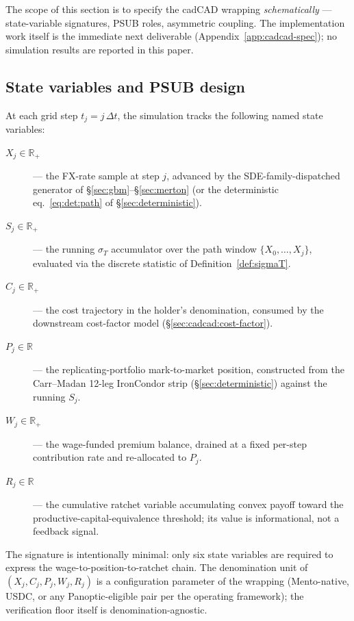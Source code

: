\documentclass[11pt,letterpaper]{article}
\newcommand{\R}{\mathbb{R}}
\newcommand{\sigmaT}{\sigma_{T}}
\begin{document}
The scope of this section is to specify the cadCAD wrapping
\emph{schematically} — state-variable signatures, PSUB roles, asymmetric
coupling. The implementation work itself is the immediate next
deliverable (Appendix~\ref{app:cadcad-spec}); no simulation results are
reported in this paper.

\subsection{State variables and PSUB design}
\label{sec:cadcad:psub}

At each grid step $t_{j} = j\,\Delta t$, the simulation tracks the
following named state variables:
\begin{description}
    \item[$X_{j} \in \R_{+}$] — the FX-rate sample at step $j$, advanced
        by the SDE-family-dispatched generator of
        \S\ref{sec:gbm}--\S\ref{sec:merton} (or the deterministic
        eq.~\eqref{eq:det:path} of \S\ref{sec:deterministic}).
    \item[$S_{j} \in \R_{+}$] — the running $\sigmaT$ accumulator over
        the path window $\{X_{0}, \dots, X_{j}\}$, evaluated via the
        discrete statistic of Definition~\ref{def:sigmaT}.
    \item[$C_{j} \in \R_{+}$] — the cost trajectory in the holder's
        denomination, consumed by the downstream cost-factor model
        (\S\ref{sec:cadcad:cost-factor}).
    \item[$P_{j} \in \R$] — the replicating-portfolio mark-to-market
        position, constructed from the Carr--Madan 12-leg IronCondor
        strip (\S\ref{sec:deterministic}) against the running $S_{j}$.
    \item[$W_{j} \in \R_{+}$] — the wage-funded premium balance,
        drained at a fixed per-step contribution rate and re-allocated
        to $P_{j}$.
    \item[$R_{j} \in \R$] — the cumulative ratchet variable accumulating
        convex payoff toward the productive-capital-equivalence
        threshold; its value is informational, not a feedback signal.
\end{description}

The signature is intentionally minimal: only six state variables are
required to express the wage-to-position-to-ratchet chain. The
denomination unit of $(X_{j}, C_{j}, P_{j}, W_{j}, R_{j})$ is a
configuration parameter of the wrapping (Mento-native, USDC, or any
Panoptic-eligible pair per the operating framework); the verification
floor itself is denomination-agnostic.
\end{document}
